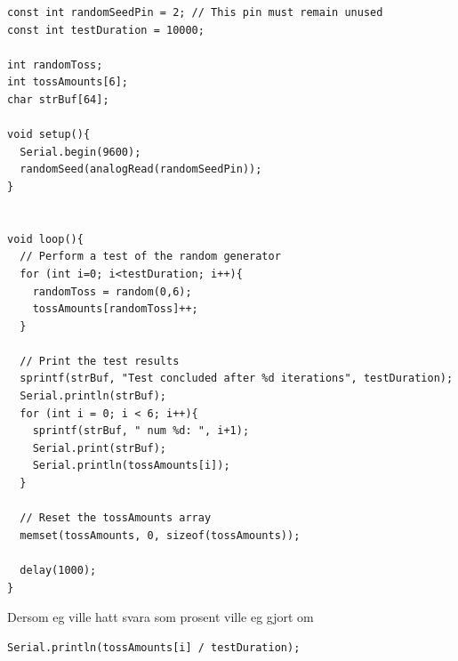 \documentclass[12pt,a4paper]{article}
\begin{document}
    \begin{lstlisting}[language=Arduino, basicstyle=\small]
const int randomSeedPin = 2; // This pin must remain unused
const int testDuration = 10000;

int randomToss;
int tossAmounts[6];
char strBuf[64];

void setup(){
  Serial.begin(9600);  
  randomSeed(analogRead(randomSeedPin));
}


void loop(){
  // Perform a test of the random generator
  for (int i=0; i<testDuration; i++){
    randomToss = random(0,6);
    tossAmounts[randomToss]++;
  }

  // Print the test results
  sprintf(strBuf, "Test concluded after %d iterations", testDuration);
  Serial.println(strBuf);
  for (int i = 0; i < 6; i++){
    sprintf(strBuf, " num %d: ", i+1);
    Serial.print(strBuf);
    Serial.println(tossAmounts[i]);
  }

  // Reset the tossAmounts array
  memset(tossAmounts, 0, sizeof(tossAmounts));

  delay(1000);
}
    \end{lstlisting}
    Dersom eg ville hatt svara som prosent ville eg gjort om
    \begin{lstlisting}[language=Arduino, basicstyle=\small]
    Serial.println(tossAmounts[i] / testDuration);
    \end{lstlisting}
\end{document}
